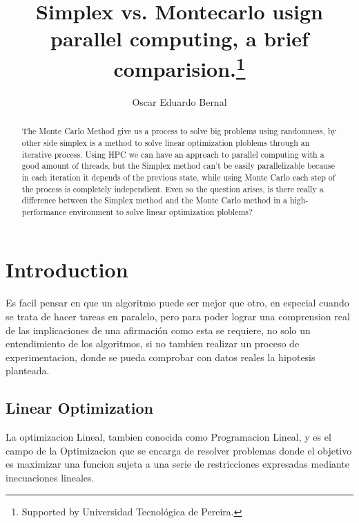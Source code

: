 \documentclass[runningheads]{llncs}
\begin{document}
%
\title{Simplex vs. Montecarlo usign parallel computing, a brief comparision.\thanks{Supported by Universidad Tecnológica de Pereira.}}
%
%
\author{Oscar Eduardo Bernal}
%
%
%
\maketitle              %
%
\begin{abstract}
The Monte Carlo Method give us a process to solve big problems using randomness, by other side simplex is a method to solve linear optimization ploblems through an iterative process. Using HPC we can have an approach to parallel computing with a good amount of threads, but the Simplex method can't be easily parallelizable because in each iteration it depends of the previous state, while using Monte Carlo each step of the process is completely independient. Even so the question arises, is there really a difference between the Simplex method and the Monte Carlo method in a high-performance environment to solve linear optimization ploblems?

\end{abstract}
%
%
%
\section{Introduction}
Es facil pensar en que un algoritmo puede ser mejor que otro, en especial cuando se trata de hacer tareas en paralelo, pero para poder lograr una comprension real de las implicaciones de una afirmación como esta se requiere, no solo un entendimiento de los algoritmos, si no tambien realizar un proceso de experimentacion, donde se pueda comprobar con datos reales la hipotesis planteada.

\subsection{Linear Optimization}
La optimizacion Lineal, tambien conocida como Programacion Lineal, y es el campo de la Optimizacion que se encarga de resolver problemas donde el objetivo es maximizar una funcion sujeta a una serie de restricciones expresadas mediante inecuaciones lineales. 
\end{document}
